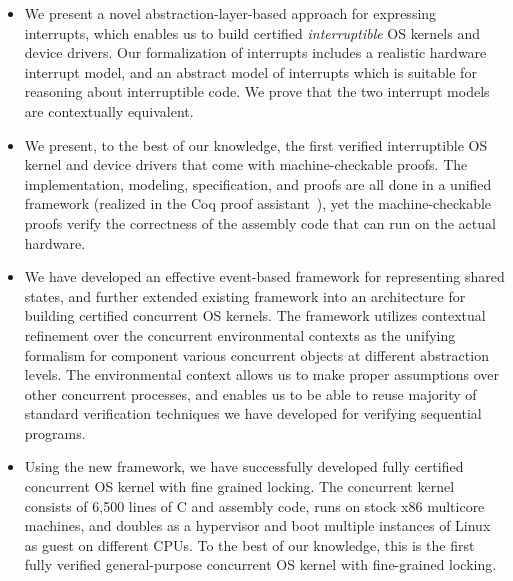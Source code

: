 \begin{itemize}
\item We present a novel abstraction-layer-based approach for
  expressing interrupts, which enables us to build certified
  {\em interruptible} OS kernels and device drivers. Our formalization of
  interrupts includes a realistic hardware interrupt model, and an
  abstract model of interrupts which is suitable for reasoning about
  interruptible code. We prove that the two interrupt models are
  contextually equivalent.

\item We present, to the best of our knowledge, the first verified
  interruptible OS kernel and device drivers that come with
  machine-checkable proofs.  The implementation, modeling, specification, and
  proofs are all done in a unified framework (realized in the Coq
  proof assistant~\cite{coq}), yet the machine-checkable proofs verify the
  correctness of the assembly code that can run on the actual
  hardware.
  
\item We have developed an effective event-based framework for representing
shared states, and further extended existing framework into an architecture
for building certified concurrent OS kernels. The framework utilizes contextual
refinement over the concurrent environmental contexts as the unifying formalism
for component various concurrent objects at different abstraction levels. 
The environmental context allows us to make proper assumptions over
other concurrent processes, and enables us to be able to reuse majority
of standard verification techniques we have developed for verifying sequential programs.

\item Using the new framework, we have successfully developed fully certified
concurrent OS kernel with fine grained locking. The concurrent kernel
consists of 6,500 lines of C and assembly code, runs on stock x86 multicore machines,
and doubles as a hypervisor and boot multiple instances of Linux as guest on different
CPUs. To the best of our knowledge, this is the first fully verified general-purpose concurrent
OS kernel with fine-grained locking.
\end{itemize}

